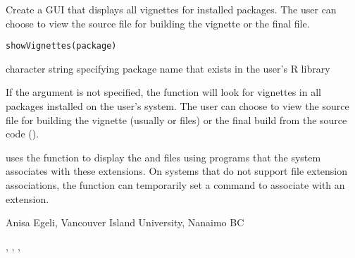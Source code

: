 \documentclass[letterpaper]{book}
\begin{document}
\begin{Description}\relax
Create a GUI that displays all vignettes for installed packages. 
The user can choose to view the source file for building the vignette 
or the final  file.
\end{Description}
\begin{Usage}
\begin{verbatim}
showVignettes(package)
\end{verbatim}
\end{Usage}
\begin{Arguments}
\begin{ldescription}
\item[\code{package}] character string specifying package name that exists in the user's R library
\end{ldescription}
\end{Arguments}
\begin{Details}\relax
If the argument  is not specified, the function
will look for vignettes in all packages installed on the user's 
system. The user can choose to view the source file 
for building the vignette (usually  or  files)
or the final build from the source code ().

 uses the  function 
 to display the  and  files 
using programs that the system associates with these extensions. 
On systems that do not support file extension associations, the 
function  can temporarily set a command to associate 
with an extension.
\end{Details}
\begin{Author}\relax
Anisa Egeli, Vancouver Island University, Nanaimo BC
\end{Author}
\begin{SeeAlso}\relax
{}, , , 
\end{SeeAlso}
\end{document}
